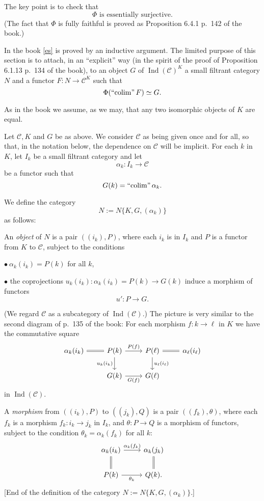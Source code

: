 \documentclass[12pt]{article}
\theoremstyle{remark}
\theoremstyle{definition}
\newcommand{\bu}{\bullet}
\newcommand{\nn}{\noindent}
\newcommand{\C}{\mathcal C}
\DeclareMathOperator*{\colim}{colim}
\DeclareMathOperator*{\ic}{``\!\colim\!"}
\DeclareMathOperator{\Ind}{Ind}
\begin{document}
The key point is to check that 
%
\begin{equation}\label{es} 
\Phi\text{ is essentially surjective.} 
\end{equation} 
%
(The fact that $\Phi$ is fully faithful is proved as Proposition 6.4.1 p.~142 of the book.) 

In the book \eqref{es} is proved by an inductive argument. The limited purpose of this section is to attach, in an ``explicit'' way (in the spirit of the proof of Proposition 6.1.13 p.~134 of the book), to an object $G$ of $\Ind(\C)^K$ a small filtrant category $N$ and a functor $F:N\to\C^K$ such that 
$$ 
\Phi(\ic F)\simeq G. 
$$ 

As in the book we assume, as we may, that any two isomorphic objects of $K$ are equal. 

Let $\C,K$ and $G$ be as above. We consider $\C$ as being given once and for all, so that, in the notation below, the dependence on $\C$ will be implicit. For each $k$ in $K$, let $I_k$ be a small filtrant category and let 
$$
\alpha_k:I_k\to\C
$$ 
be a functor such that 
$$
G(k)=\ic\alpha_k.
$$ 

We define the category 
$$
N:=N\{K,G,(\alpha_k)\}
$$ 
as follows:

\nn[Beginning of the definition of the category $N:=N\{K,G,(\alpha_k)\}$.] An \emph{object} of $N$ is a pair $((i_k),P)$, where each $i_k$ is in $I_k$ and $P$ is a functor from $K$ to $\C$, subject to the conditions 

\nn$\bu\ \alpha_k(i_k)=P(k)$ for all $k$, 

\nn$\bu$ the coprojections $u_k(i_k):\alpha_k(i_k)=P(k)\to G(k)$ induce a morphism of functors 
%
\begin{equation}\label{u':}
u':P\to G.
\end{equation}

\nn(We regard $\C$ as a subcategory of $\Ind(\C)$.) The picture is very similar to the second diagram of p.~135 of the book: For each morphism $f:k\to\ell$ in $K$ we have the commutative square 
$$ 
\begin{tikzcd} 
\alpha_k(i_k)\ar[equal]{r}&P(k)\ar{r}{P(f)}\ar{d}[swap]{u_k(i_k)}&P(\ell)\ar{d}{u_\ell(i_\ell)}\ar[equal]{r}&\alpha_\ell(i_\ell)\\ 
{}&G(k)\ar{r}[swap]{G(f)}&G(\ell) 
\end{tikzcd} 
$$ 
in $\Ind(\C)$. 

A \emph{morphism} from $((i_k),P)$ to $((j_k),Q)$ is a pair $((f_k),\theta)$, where each $f_k$ is a morphism $f_k:i_k\to j_k$ in $I_k$, and $\theta:P\to Q$ is a morphism of functors, subject to the condition $\theta_k=\alpha_k(f_k)$ for all $k$: 
$$ 
\begin{tikzcd} 
\alpha_k(i_k)\ar{r}{\alpha_k(f_k)}\ar[equal]{d}&\alpha_k(j_k)\ar[equal]{d}\\ 
P(k)\ar{r}[swap]{\theta_k}&Q(k).
\end{tikzcd} 
$$ 
[End of the definition of the category $N:=N\{K,G,(\alpha_k)\}$.] 
\end{document}
